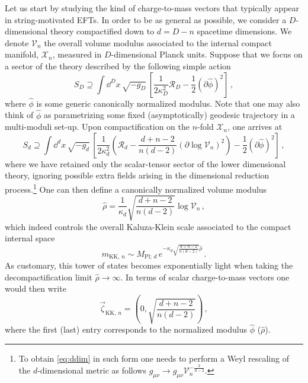 Let us start by studying the kind of charge-to-mass vectors that typically appear in string-motivated EFTs. In order to be as general as possible, we consider a $D$-dimensional theory compactified down to $d=D-n$ spacetime dimensions. We denote $\mathcal{V}_n$ the overall volume modulus associated to the internal compact manifold, $\mathcal{X}_n$, measured in $D$-dimensional Planck units. Suppose that we focus on a sector of the theory described by the following simple action \cite{Etheredge:2022opl}
%
\begin{equation}\label{eq:higherDdim}
	S_{D} \supseteq \int \dd^{D}x\, \sqrt{-g_D}\,  \left[  \frac{1}{2\kappa_{D}^2}\mathcal{R}_{D} - \frac{1}{2}\left(\partial \hat \phi \right)^2 \right]\, ,
\end{equation}
%
where $\hat{\phi}$ is some generic canonically normalized modulus. Note that one may also think of $\hat \phi$ as parametrizing some fixed (asymptotically) geodesic trajectory in a multi-moduli set-up. Upon compactification on the $n$-fold $\mathcal{X}_n$, one arrives at
%
\begin{equation}\label{eq:ddim}
	S_{d} \supseteq \int \dd^{d}x\, \sqrt{-g_d}\,  \left[ \frac{1}{2\kappa_{d}^2} \left(\mathcal{R}_{d} - \frac{d+n-2}{n (d-2)} \left(\partial \log \mathcal{V}_n \right)^2 \right)- \frac{1}{2} \left(\partial \hat \phi \right)^2 \right]\, ,
\end{equation}
%
where we have retained only the scalar-tensor sector of the lower dimensional theory, ignoring possible extra fields arising in the dimensional reduction process.\footnote{To obtain \eqref{eq:ddim} in such form one needs to perform a Weyl rescaling of the $d$-dimensional metric as follows $g_{\mu \nu} \to g_{\mu \nu} \mathcal{V}_n^{-\frac{2}{d-2}}$.} One can then define a canonically normalized volume modulus
%
\begin{equation}\label{eq:canonicalvolume}
	\hat \rho = \frac{1}{\kappa_d}\sqrt{\frac{d+n-2}{n(d-2)}} \log \mathcal{V}_n\, ,
\end{equation}
%
which indeed controls the overall Kaluza-Klein scale associated to the compact internal space
%
\begin{equation}\label{eq:KKscale}
	m_{\text{KK},\, n} \sim  M_{\text{Pl};\, d}\, e^{-\kappa_d \sqrt{\frac{d+n-2}{n (d-2)}} \hat \rho}\, .
\end{equation}
%
As customary, this tower of states becomes exponentially light when taking the decompactification limit $\hat \rho \to \infty$. In terms of scalar charge-to-mass vectors one would then write
%
\begin{equation}\label{eq:kkcharge2mass}
	\vec{\zeta}_{\text{KK},\, n} = \left( 0 , \sqrt{\frac{d+n-2}{n (d-2)}} \right)\, ,
\end{equation}
%
where the first (last) entry corresponds to the normalized modulus $\hat \phi$ ($\hat \rho$).
	
